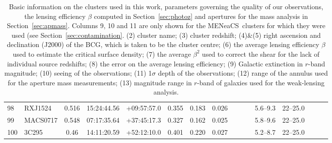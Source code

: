 \documentclass[useAMS,usenatbib]{mnras}
\newcommand{\mn}{MENeaCS}
\begin{document}
\begin{table}
\begin{tabular*}{1.0\textwidth}{ l l c c c r c c c c c c c c c c }
98 & RXJ1524 & 0.516 & 15:24:44.56 & +09:57:57.0 & 0.355 & 0.183 & 0.026 \hspace{8pt}& & & \hspace{8pt}& 5.6--9.3 \hspace{8pt}& 22--25.0 \\
99 & MACS0717 & 0.548 & 07:17:35.64 & +37:45:17.3 & 0.327 & 0.162 & 0.025 \hspace{8pt}& & & \hspace{8pt}& 5.8--9.6 \hspace{8pt}& 22--25.0 \\
100 & 3C295 & 0.46 & 14:11:20.59 & +52:12:10.0 & 0.401 & 0.220 & 0.027 \hspace{8pt}& & & \hspace{8pt}& 5.2--8.7 \hspace{8pt}& 22--25.0 \\
\hline 
 \end{tabular*}
\caption{Basic information on the clusters used in this work, parameters governing the quality of our observations, the lensing efficiency $\beta$ computed in Section~\ref{sec:photoz} and apertures for the mass analysis in Section~\ref{sec:apmass}. Columns 9, 10 and 11 are only shown for the \mn \ clusters for which they were used (see Section~\ref{sec:contamination}. (2) cluster name; (3) cluster redshift; (4)\&(5) right ascension and declination (J2000) of the BCG, which is taken to be the cluster centre; (6) the average lensing efficiency $\beta$ used to estimate the critical surface density; (7) the average $\beta^2$ used to correct the shear for the lack of individual source redshifts; (8) the error on the average lensing efficiency; (9) Galactic extinction in $r$-band magnitude; (10) seeing of the observations; (11) 1$\sigma$ depth of the observations; (12) range of the annulus used for the aperture mass measurements; (13) magnitude range in $r$-band of galaxies used for the weak-lensing analysis.  } \label{tbl:redshifts}
\end{table}




















\end{document}
